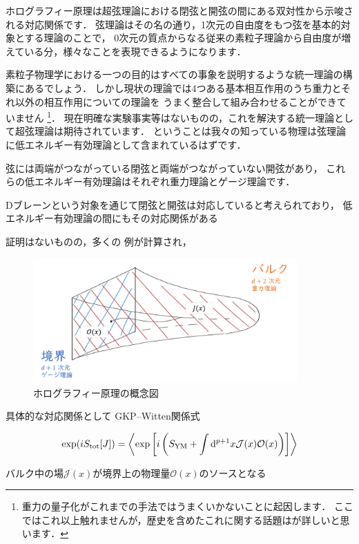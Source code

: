 \documentclass[b5paper,11pt,dvipdfmx]{jsarticle}
\numberwithin{equation}{section}
\theoremstyle{definition}
\begin{document}
ホログラフィー原理は超弦理論における閉弦と開弦の間にある双対性から示唆される対応関係です．
弦理論はその名の通り，1次元の自由度をもつ弦を基本的対象とする理論のことで，
0次元の質点からなる従来の素粒子理論から自由度が増えている分，様々なことを表現できるようになります．

素粒子物理学における一つの目的はすべての事象を説明するような統一理論の構築にあるでしょう．
しかし現状の理論では4つある基本相互作用のうち重力とそれ以外の相互作用についての理論を
うまく整合して組み合わせることができていません
\footnote{重力の量子化がこれまでの手法ではうまくいかないことに起因します．
ここではこれ以上触れませんが，歴史を含めたこれに関する話題は\cite{Yoneya21}が詳しいと思います．}．
現在明確な実験事実等はないものの，これを解決する統一理論として超弦理論は期待されています．
ということは我々の知っている物理は弦理論に低エネルギー有効理論として含まれているはずです．


弦には両端がつながっている閉弦と両端がつながっていない開弦があり，
これらの低エネルギー有効理論はそれぞれ重力理論とゲージ理論です．

Dブレーンという対象を通じて閉弦と開弦は対応していると考えられており，
低エネルギー有効理論の間にもその対応関係がある


証明はないものの，多くの
例が計算され，
\begin{figure}[t]
    \centering
    \includegraphics[width=0.9\textwidth]{holography.png}
    \caption{ホログラフィー原理の概念図}
    \label{fig:holography}
\end{figure}

具体的な対応関係として
GKP--Witten関係式\cite{Gubser98,Witten98}

\begin{equation}
    \exp(i S_{\text{tot}}[J])
    = \ev{\exp\left[ i \left( S_{\text{YM}}
    + \int \dd^{p+1} x \mathcal{J}(x) \mathcal{O}(x) \right)\right]}
\end{equation}

バルク中の場$\mathcal{J}(x)$が境界上の物理量$\mathcal{O}(x)$のソースとなる
\end{document}
